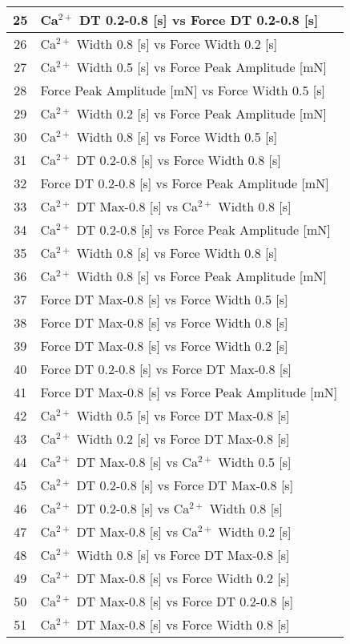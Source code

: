 \documentclass{article}
\begin{document}
\begin{longtable}{|c|l|}
\hline
25 & Ca$^{2+}$ DT 0.2-0.8 [s] vs Force DT 0.2-0.8 [s] \\
\hline
26 & Ca$^{2+}$ Width 0.8 [s] vs Force Width 0.2 [s] \\
\hline
27 & Ca$^{2+}$ Width 0.5 [s] vs Force Peak Amplitude [mN] \\
\hline
28 & Force Peak Amplitude [mN] vs Force Width 0.5 [s] \\
\hline
29 & Ca$^{2+}$ Width 0.2 [s] vs Force Peak Amplitude [mN] \\
\hline
30 & Ca$^{2+}$ Width 0.8 [s] vs Force Width 0.5 [s] \\
\hline
31 & Ca$^{2+}$ DT 0.2-0.8 [s] vs Force Width 0.8 [s] \\
\hline
32 & Force DT 0.2-0.8 [s] vs Force Peak Amplitude [mN] \\
\hline
33 & Ca$^{2+}$ DT Max-0.8 [s] vs Ca$^{2+}$ Width 0.8 [s] \\
\hline
34 & Ca$^{2+}$ DT 0.2-0.8 [s] vs Force Peak Amplitude [mN] \\
\hline
35 & Ca$^{2+}$ Width 0.8 [s] vs Force Width 0.8 [s] \\
\hline
36 & Ca$^{2+}$ Width 0.8 [s] vs Force Peak Amplitude [mN] \\
\hline
37 & Force DT Max-0.8 [s] vs Force Width 0.5 [s] \\
\hline
38 & Force DT Max-0.8 [s] vs Force Width 0.8 [s] \\
\hline
39 & Force DT Max-0.8 [s] vs Force Width 0.2 [s] \\
\hline
40 & Force DT 0.2-0.8 [s] vs Force DT Max-0.8 [s] \\
\hline
41 & Force DT Max-0.8 [s] vs Force Peak Amplitude [mN] \\
\hline
42 & Ca$^{2+}$ Width 0.5 [s] vs Force DT Max-0.8 [s] \\
\hline
43 & Ca$^{2+}$ Width 0.2 [s] vs Force DT Max-0.8 [s] \\
\hline
44 & Ca$^{2+}$ DT Max-0.8 [s] vs Ca$^{2+}$ Width 0.5 [s] \\
\hline
45 & Ca$^{2+}$ DT 0.2-0.8 [s] vs Force DT Max-0.8 [s] \\
\hline
46 & Ca$^{2+}$ DT 0.2-0.8 [s] vs Ca$^{2+}$ Width 0.8 [s] \\
\hline
47 & Ca$^{2+}$ DT Max-0.8 [s] vs Ca$^{2+}$ Width 0.2 [s] \\
\hline
48 & Ca$^{2+}$ Width 0.8 [s] vs Force DT Max-0.8 [s] \\
\hline
49 & Ca$^{2+}$ DT Max-0.8 [s] vs Force Width 0.2 [s] \\
\hline
50 & Ca$^{2+}$ DT Max-0.8 [s] vs Force DT 0.2-0.8 [s] \\
\hline
51 & Ca$^{2+}$ DT Max-0.8 [s] vs Force Width 0.8 [s] \\
\hline

\end{longtable}
\end{document}
